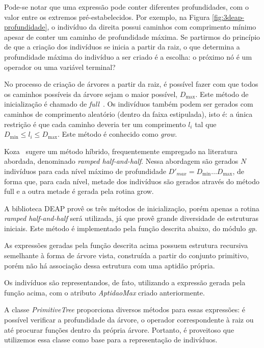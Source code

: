Pode-se notar que uma expressão pode conter diferentes profundidades, com o valor entre os extremos pré-estabelecidos. Por exemplo, na Figura \ref{fig:3deap-profundidade}, o indivíduo da direita possui caminhos com comprimento mínimo apesar de conter um caminho de profundidade máxima. Se partirmos do princípio de que a criação dos indivíduos se inicia a partir da raiz, o que determina a profundidade máxima do indivíduo a ser criado é a escolha: o próximo nó é um operador ou uma variável terminal?

No processo de criação de árvores a partir da raiz, é possível fazer com que todos os caminhos possíveis da árvore sejam o maior possível, $D_{\max}$. Este método de inicialização é chamado de \textit{full}~\cite{koza92bookGp}. Os indivíduos também podem ser gerados com caminhos de comprimento aleatório (dentro da faixa estipulada), isto é: a única restrição é que cada caminho deveria ter um comprimento $l_i$ tal que $D_{\min} \le l_i \le D_{\max}$. Este método é conhecido como \textit{grow}.

Koza~\cite{koza92bookGp} sugere um método híbrido, frequentemente empregado na literatura abordada, denominado \textit{ramped half-and-half}. Nessa abordagem são gerados $N$ indivíduos para cada nível máximo de profundidade $D'_{max}=D_{\min}\ldots D_{\max}$, de forma que, para cada nível, metade dos indivíduos são gerados através do método full e a outra metade é gerada pela rotina grow.

A biblioteca DEAP provê os três métodos de inicialização, porém apenas a rotina \textit{ramped half-and-half} será utilizada, já que provê grande diversidade de estruturas iniciais. Este método é implementado pela função descrita abaixo, do módulo \textit{gp}.


As expressões geradas pela função descrita acima possuem estrutura recursiva semelhante à forma de árvore vista, construída a partir do conjunto primitivo, porém não há associação dessa estrutura com uma aptidão própria.

Os indivíduos são representandos, de fato, utilizando a expressão gerada pela função acima, com o atributo \textit{AptidaoMax} criado anteriormente.

A classe \textit{PrimitiveTree} proporciona diversos métodos para essas expressões: é possível verificar a profundidade da árvore, o operador correspondente à raiz ou até procurar funções dentro da própria árvore. Portanto, é proveitoso que utilizemos essa classe como base para a representação de indivíduos.

